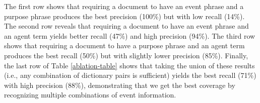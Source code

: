 The first row shows that requiring a document to have an event phrase
and a purpose phrase produces the best precision (100\%) but with low
recall (14\%). The second row reveals that requiring a document to
have an event phrase and an agent term yields  better
recall (47\%) and high precision (94\%). The third row shows
that requiring a document to have a purpose phrase and an agent term
produces the best recall (50\%) but with slightly lower precision
(85\%). 
Finally, the last row of Table
\ref{ablation-table} shows that taking the union of these results
(i.e., any combination of dictionary pairs is sufficient) yields the best recall
(71\%) with high precision (88\%), demonstrating that we get the best coverage
by recognizing multiple combinations of event information.







